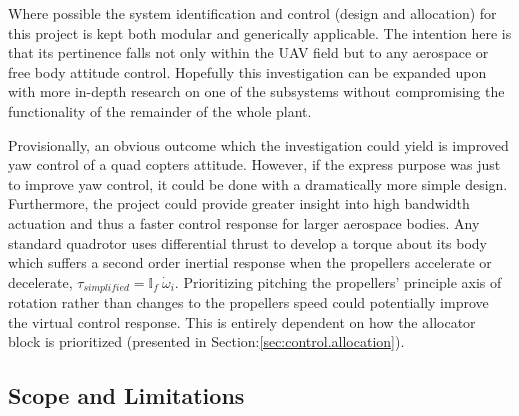 \par
Where possible the system identification and control (design and allocation) for this project is kept both modular and generically applicable. The intention here is that its pertinence falls not only within the UAV field but to any aerospace or free body attitude control. Hopefully this investigation can be expanded upon with more in-depth research on one of the subsystems without compromising the functionality of the remainder of the whole plant.
\par
Provisionally, an obvious outcome which the investigation could yield is improved yaw control of a quad copters attitude. However, if the express purpose was just to improve yaw control, it could be done with a dramatically more simple design. Furthermore, the project could provide greater insight into high bandwidth actuation and thus a faster control response for larger aerospace bodies. Any standard quadrotor uses differential thrust to develop a torque about its body which suffers a second order inertial response when the propellers accelerate or decelerate, $\tau_{simplified}=\mathbb{I}_f~\dot{\omega}_{i}$. Prioritizing pitching the propellers' principle axis of rotation rather than changes to the propellers speed could potentially improve the virtual control response. This is entirely dependent on how the allocator block is prioritized (presented in Section:\ref{sec:control.allocation}).
\subsection{Scope and Limitations}
\label{subsec:intro.foreword.scopeandlim}
